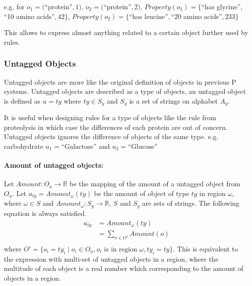 \documentclass[9pt,a4paper,twoside]{article}
\begin{document}
                e.g. for
                $o_1 = ($``protein''$, 1)$,
                $o_2 = ($``protein''$, 2)$,
                $Property(o_1) = \{$``has glycine''$,$``10 amino acids''$,42\}$,
                $Property(o_2) = \{$``has leucine''$,$``20 amino acids''$,233\}$
                
                This allows to express almost anything related to a certain object further used by rules.
                            
        \subsubsection{Untagged Objects}
                
            Untagged objects are more like the original definition of objects in previous P systems.
            Untagged objects are described as a type of objects, an untagged object is defined as $u = ty$ where $ty \in S_y$ and $S_y$ is a set of strings on alphabet $A_y$. 
            
            It is useful when designing rules for a type of objects like the rule from proteolysis in which case the differences of each protein are out of concern.
            Untagged objects ignores the difference of objects of the same type. e.g. carbohydrate $u_1 = \text{``Galactose''}$ and $u_2 = \text{``Glucose''} $
            \paragraph{Amount of untagged objects:}
            
                Let $Amount: O_u \rightarrow \mathbb{R}$ be the mapping of the amount of a untagged object from $O_u$.
                Let $a_{ty} = Amount_\omega(ty)$ be the amount of object of type $ty$ in region $\omega$, where $\omega \in S$ and $Amount_\omega: S_y \rightarrow \mathbb{R}$, 
                $S$ and $S_y$ are sets of strings. The following equation is always satisfied.
                \begin{equation}
                    \begin{aligned}
                        a_{ty} &= Amount_\omega(ty) \\
                        &= \sum_{o \in O'}{Amount(o)} \\
                    \end{aligned}
                \end{equation}
                where $O' = \{ o_i = ty_i \mid o_i \in O_u, o_i\text{ is in region }\omega, ty_i = ty \} $. This is equivalent to the expression with multi-set of 
                untagged objects in a region, where the multitude of each object is a real number which corresponding to the amount of objects in a region. 
            
\end{document}
